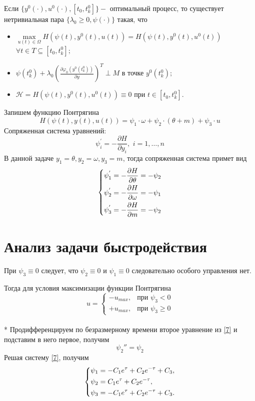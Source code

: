 \documentclass[a4paper,12pt, openany]{book}
\theoremstyle{plain} %
\theoremstyle{definition} %
\theoremstyle{remark} %
\numberwithin{equation}{chapter}
\begin{document}
{Если $\{y^0(\cdot),u^0(\cdot),[t_0,t_k^0]\} - $ оптимальный процесс, то существует нетривиальная пара $\{\lambda_0\geq0,\psi(\cdot)\}$
такая, что
\begin{itemize}
    \item $ \mathop {\max }\limits_{u(t) \in \Omega}  H(\psi(t),y^0(t),u(t))=H(\psi(t),y^0(t),u^0(t))$
          $\forall t \in T \subseteq [t_0,t_k^0];$
    \item $\psi(t_k^0)+\lambda_0(\frac{\partial \varphi_0(y^0(t_k^0))}{\partial y})^T \perp M \text{ в точке } y^0(t_k^0);$
    \item $\mathcal{H}=H(\psi(t),y^0(t),u^0(t))\equiv0 \text{ при } t \in [t_0,t_k^0].$
\end{itemize}
Запишем функцию Понтрягина
\[
    H(\psi(t),y(t),u(t))=\psi_1\cdot\omega+\psi_2\cdot(\theta+m)+\psi_3\cdot u
\]
Сопряженная система уравнений:
\[
    \psi^{'}_i  =  - \frac{{\partial H}}{{\partial y_i }},\,\,i = 1, \ldots ,n
\]
В данной задаче $y_1 = \theta, y_2 = \omega, y_3=m$, тогда сопряженная система примет вид
\begin{equation} \label{7}
    \left\{ {\begin{aligned}
                 & \psi^{'}_1=  - \frac{{\partial H}}{{\partial \theta}} = - \psi_2\hfill  \\
                 & \psi^{'}_2=  - \frac{{\partial H}}{{\partial \omega }} = - \psi_1\hfill \\
                 & \psi^{'}_3=  - \frac{{\partial H}}{{\partial m }} = - \psi_2 \hfill     \\
            \end{aligned}} \right.
\end{equation}

\section{Анализ задачи быстродействия}


При $\psi_3\equiv0$ следует, что $\psi_2\equiv0$ и $\psi_1\equiv0$ следовательно особого управления нет.

Тогда для условия максимизации функции Понтрягина
\[
    u=
    \begin{cases}
        -u_{max}, & \text{при $\psi_3<0$}          \\
        +u_{max}, & \text{при $\psi_3\geqslant 0$}
    \end{cases}
\]\\*
Продифференцируем по безразмерному времени второе уравнение из \eqref{7} и подставим в него первое, получим
\[
    \psi_2 ''=\psi_2
\]
Решая систему \eqref{7}, получим
\[
    \left\{ {\begin{aligned}
                 & \psi_1 = -C_1e^\tau+C_2e^{-\tau}+C_3, \hfill  \\
                 & \psi_2 = C_1e^\tau+C_2e^{-\tau} , \hfill      \\
                 & \psi_3 = -C_1e^\tau+C_2e^{-\tau}+C_3 . \hfill \\
            \end{aligned}} \right.
\]

}
\end{document}
